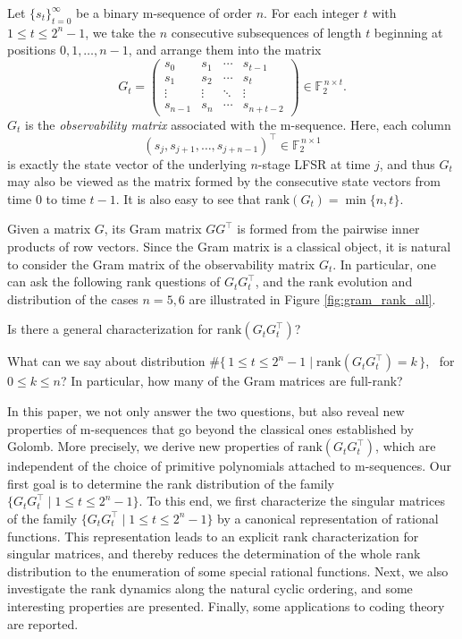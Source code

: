 \documentclass[hidelinks,onefignum,onetabnum]{siamart251216}
\theoremstyle{definition}
\theoremstyle{remark}
\providecommand{\rank}{{\mathrm{rank}}}
\begin{document}
Let $\{s_t\}_{t=0}^\infty$ be a binary m-sequence of order $n$. For each integer $t$ with $1 \le t \le 2^n-1$, we take the $n$ consecutive subsequences of length $t$ beginning at positions $0,1,\dots,n-1$, and arrange them into the matrix
\begin{equation}
G_t=
\begin{pmatrix}
	s_0 & s_1 & \cdots & s_{t-1}\\
	s_1 & s_2 & \cdots & s_t\\
	\vdots & \vdots & \ddots & \vdots\\
	s_{n-1} & s_n & \cdots & s_{n+t-2}
\end{pmatrix}
\in \mathbb{F}_2^{\,n\times t}.
\end{equation}
 $G_t$ is the \textit{observability matrix} associated with the m-sequence. Here, each column
\[
(s_j,s_{j+1},\dots,s_{j+n-1})^\top \in \mathbb{F}_2^{\,n\times 1}
\]
is exactly the state vector of the underlying $n$-stage LFSR at time $j$, and thus $G_t$ may also be viewed as the matrix formed by the consecutive state vectors from time $0$ to time $t-1$. It is also easy to see that $\rank(G_{t})=\min\{n,t\}$.

Given a matrix $G$, its Gram matrix $GG^{\top}$ is formed from the pairwise inner 
products of row vectors. Since the Gram matrix is a classical object, it is natural to consider the Gram matrix of the observability matrix $G_{t}$. In particular, one can ask the following rank questions of $G_tG_t^{\top}$, and the rank evolution and distribution of the cases $n=5,6$ are illustrated in Figure \ref{fig:gram_rank_all}. 

\vspace{0.5em}
 Is there a general characterization for $\rank(G_t G_t^\top)$?
\vspace{0.5em}

  What can we say about distribution $\displaystyle \#\{\, 1 \le t \le 2^n - 1 \mid\rank(G_t G_t^\top) = k \,\}$, \ for $0 \le k \le n$? In particular, how many of the Gram matrices are full-rank?

 \vspace{0.3em}




In this paper, we not only answer the two questions, but also reveal new properties of m-sequences that go beyond the classical ones established by Golomb. More precisely, we derive new properties of $\rank(G_t G_t^\top)$, which are independent of the choice of primitive polynomials attached to m-sequences. Our first goal is to determine the rank distribution of the family $\{G_t G_t^\top \mid 1 \le t \le 2^n-1\}$. To this end, we first characterize the singular matrices of the family $\{G_tG_t^\top \mid 1\le t\le 2^n-1\}$ by a canonical representation of rational functions. This representation leads to an explicit rank characterization for singular matrices, and thereby reduces the determination of the whole rank distribution to the enumeration of some special rational functions. Next, we also investigate the rank dynamics along the natural cyclic ordering, and some interesting properties are presented. Finally, some applications to coding theory are reported.
\end{document}
